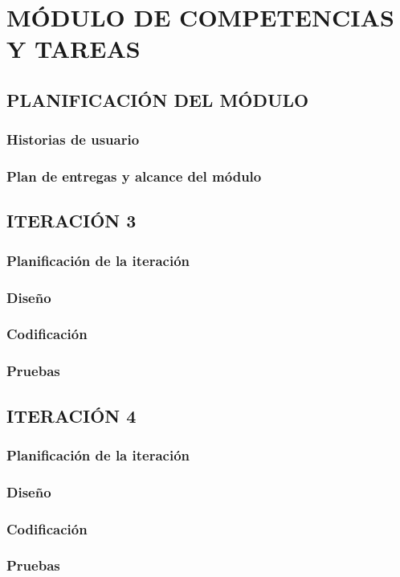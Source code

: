 \chapter{MÓDULO DE COMPETENCIAS Y TAREAS}

\section{PLANIFICACIÓN DEL MÓDULO}

\subsection{Historias de usuario}

\subsection{Plan de entregas y alcance del módulo}

\section{ITERACIÓN 3}

\subsection{Planificación de la iteración}

\subsection{Diseño}

\subsection{Codificación}

\subsection{Pruebas}

\section{ITERACIÓN 4}

\subsection{Planificación de la iteración}

\subsection{Diseño}

\subsection{Codificación}

\subsection{Pruebas}
